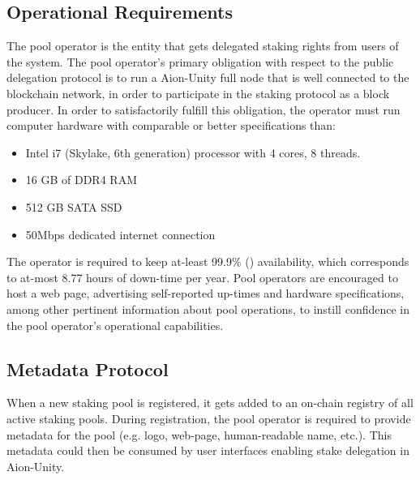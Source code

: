 \subsection{Operational Requirements} \label{operator_requirements}
The pool operator is the entity that gets delegated staking rights from users of the system. The pool operator's primary obligation with respect to the public delegation protocol is to run a Aion-Unity full node that is well connected to the blockchain network, in order to participate in the staking protocol as a block producer. In order to satisfactorily fulfill this obligation, the operator must run computer hardware with comparable or better specifications than:
\begin{itemize}
    \item Intel i7 (Skylake, 6th generation) processor with 4 cores, 8 threads.
    \item 16 GB of DDR4 RAM 
    \item 512 GB SATA SSD
    \item 50Mbps dedicated internet connection  
\end{itemize}
The operator is required to keep at-least 99.9\% () availability, which corresponds to at-most 8.77 hours of down-time per year. Pool operators are encouraged to host a web page, advertising self-reported up-times and hardware specifications, among other pertinent information about pool operations, to instill confidence in the pool operator's operational capabilities. 


\clearpage
\subsection{Metadata Protocol} \label{metadata_protocol}
When a new staking pool is registered, it gets added to an on-chain registry of all active staking pools. During registration, the pool operator is required to provide metadata for the pool (e.g. logo, web-page, human-readable name, etc.). This metadata could then be consumed by user interfaces enabling stake delegation in Aion-Unity. 

